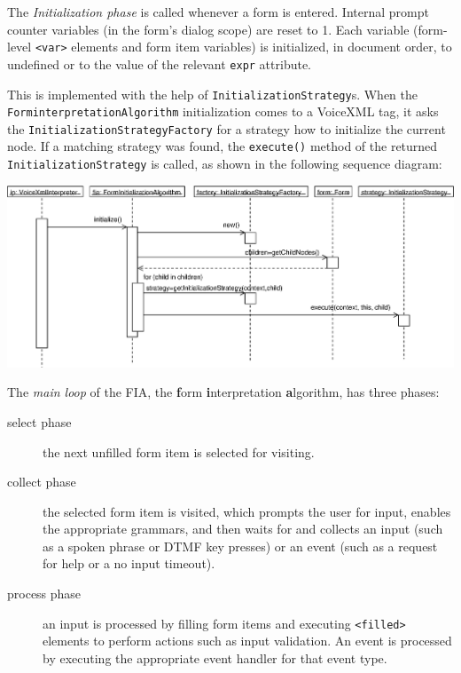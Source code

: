 \documentclass[11pt,a4paper]{article}
\begin{document}
The \emph{Initialization phase} is called whenever a form is entered.
Internal prompt counter variables (in the form's dialog scope) are reset to 1.
Each variable (form-level \texttt{<var>} elements and form item variables) is 
initialized, in document order, to undefined or to the value of the relevant 
\texttt{expr} attribute.

This is implemented with the help of \texttt{InitializationStrategy}s.
When the \texttt{ForminterpretationAlgorithm} initialization comes to a 
VoiceXML tag, it asks the \texttt{InitializationStrategyFactory} for a strategy
how to initialize the current node. If a matching strategy was found, the
\texttt{execute()} method of the returned \texttt{InitializationStrategy}
is called, as shown in the following sequence diagram:

\begin{center}
\includegraphics[scale=0.45]{seq-interpreter-fia-initialize.eps}
\end{center}

The \emph{main loop} of the FIA, the \textbf{f}orm \textbf{i}nterpretation
\textbf{a}lgorithm, has three phases:

\begin{description}
\item[select phase] the next unfilled form item is selected for visiting.
\item[collect phase] the selected form item is visited, which prompts the user
for input, enables the appropriate grammars, and then waits for and collects 
an input (such as a spoken phrase or DTMF key presses) or an event 
(such as a request for help or a no input timeout).
\item[process phase] an input is processed by filling form items and executing
\texttt{<filled>} elements to perform actions such as input validation.
An event is processed by executing the appropriate event handler for that 
event type.
\end{description}
\end{document}
